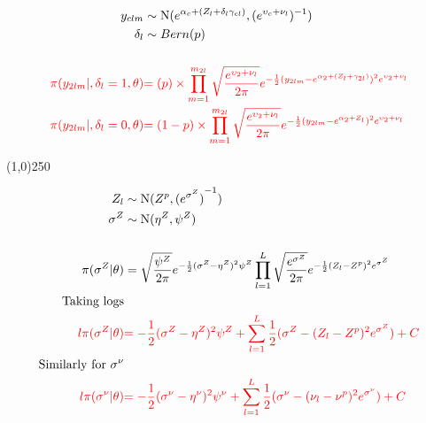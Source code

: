 \begin{align*}
y_{clm} &\sim \operatorname{N}(e^{\alpha_{c}+(Z_{l}+\delta_{l}\gamma_{cl})},(e^{ \upsilon_{c}+\nu_{l} })^{-1})\\
\delta_{l} &\sim Bern(p)\\
\\
\color{red}{
\pi(y_{2lm}|,\delta_{l}=1,\theta)}&
\color{red}{
=(p)\times
\prod_{m=1}^{m_{2l}}\sqrt{\frac{e^{ \upsilon_{2}+\nu_{l} }}{2\pi}} e^{-\frac{1}{2}(y_{2lm}-e^{\alpha_{2}+(Z_{l}+\gamma_{2l})})^{2}e^{ \upsilon_{2}+\nu_{l} } }
}
\\
\color{red}{
\pi(y_{2lm}|,\delta_{l}=0,\theta)}&
\color{red}{
=(1-p)\times
\prod_{m=1}^{m_{2l}}\sqrt{\frac{e^{ \upsilon_{2}+\nu_{l} }}{2\pi}} e^{-\frac{1}{2}(y_{2lm}-e^{\alpha_{2}+Z_{l}})^{2}e^{ \upsilon_{2}+\nu_{l} } }
}
\\
\end{align*}


\begin{center}
\line(1,0){250}
\end{center}

\begin{align*}
Z_{l} &\sim \operatorname{N}(Z^{p},{(e^{\sigma^{Z}})}^{-1})\\ 
\sigma^{Z} &\sim \operatorname{N}(\eta^{Z},\psi^{Z})\\
\\
\pi(\sigma^{Z}|\theta)&=\sqrt{\frac{\psi^{Z}}{2\pi}} e^{-\frac{1}{2}(\sigma^{Z}-\eta^{Z})^{2}\psi^{Z} }
\prod_{l=1}^{L}\sqrt{\frac{e^{\sigma^{Z}}}{2\pi}} e^{-\frac{1}{2}(Z_{l}-Z^{p})^{2}e^{\sigma^{Z}} }\\
\text{Taking logs}\\
\color{red}{l\pi(\sigma^{Z}|\theta)}&
\color{red}{
=-\frac{1}{2}(\sigma^{Z}-\eta^{Z})^{2}\psi^{Z}
+
\sum_{l=1}^{L}\frac{1}{2}(\sigma^{Z} -(Z_{l}-Z^{p})^{2}e^{\sigma^{Z}})
+C}
\\
\text{Similarly for $\sigma^{\nu}$}\\
\color{red}{l\pi(\sigma^{\nu}|\theta)}&
\color{red}{
=-\frac{1}{2}(\sigma^{\nu}-\eta^{\nu})^{2}\psi^{\nu}
+
\sum_{l=1}^{L}\frac{1}{2}(\sigma^{\nu} -(\nu_{l}-\nu^{p})^{2}e^{\sigma^{\nu}})
+C}
\end{align*}

